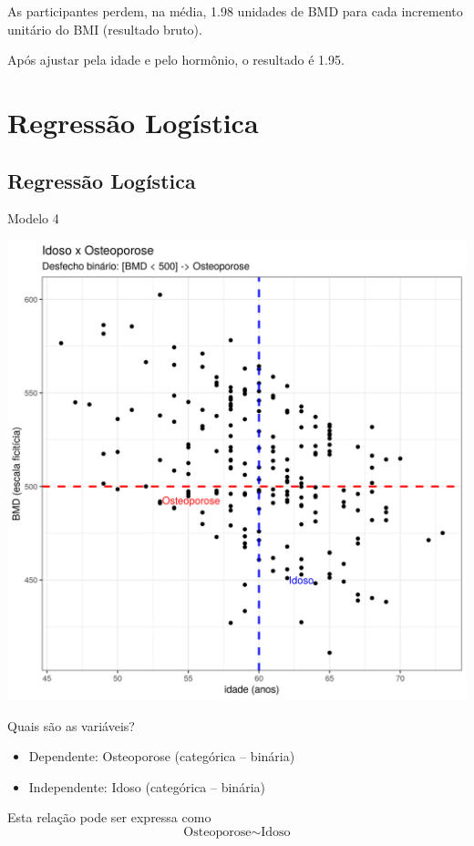 \documentclass{beamer}
\begin{document}
\begin{frame}
  \begin{block}{}
    As participantes perdem, na média, 1.98 unidades de BMD para cada incremento unitário do BMI (resultado bruto).

    \bigskip
    Após ajustar pela idade e pelo hormônio, o resultado é 1.95.
  \end{block}
\end{frame}

\section{Regressão Logística}

\subsection{Regressão Logística}

\begin{frame}{\small Modelo 4}
  \begin{center}
    \includegraphics[height=.9\textheight]{Cap31-32/pratica-glm4}
  \end{center}
\end{frame}

\begin{frame}{Quais são as variáveis?}
  \begin{itemize}
  \item \alert{Dependente: Osteoporose (categórica -- binária)}
  \item Independente: Idoso (categórica -- binária)
  \end{itemize}
  \vfill
  \begin{block}{Esta relação pode ser expressa como}
    \begin{displaymath}
      \text{Osteoporose} \sim \text{Idoso}
    \end{displaymath}
  \end{block}
\end{frame}
\end{document}

